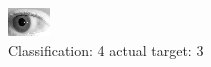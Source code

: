 \begin{figure}[h!]
\begin{center}
\includegraphics[width=0.60\columnwidth]{figures/ID310_class_4_target_3.png}
\end{center}
\caption{ Classification: 4 actual target: 3}
\label{fig:ID310_class_4_target_3}
\end{figure}
